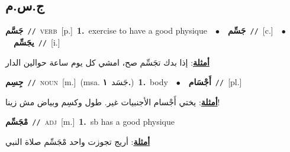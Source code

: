 \documentclass[10pt,a4paper,twoside]{article} %
\begin{document}
\begin{multicols}{2}
\vspace{-3mm}
\subsection*{\color{blue}\foreignlanguage{arabic}{ج.س.م}\color{blue}{}} 

{\setlength\topsep{0pt}\textbf{\foreignlanguage{arabic}{جَسَّم}}\ {\color{gray}\texttt{//}\color{black}}\ \textsc{verb}\ [p.]\ \textbf{1.}~exercise to have a good physique\ \ $\bullet$\ \ \setlength\topsep{0pt}\textbf{\foreignlanguage{arabic}{جَسِّم}}\ {\color{gray}\texttt{//}\color{black}}\ [c.]\ \ $\bullet$\ \ \setlength\topsep{0pt}\textbf{\foreignlanguage{arabic}{يجَسِّم}}\ {\color{gray}\texttt{//}\color{black}}\ [i.]\  \begin{flushright}\color{gray}\foreignlanguage{arabic}{\textbf{\underline{\foreignlanguage{arabic}{أمثلة}}}: إذا بدك تجَسِّم صح، امشي كل يوم ساعة حوالين الدار}\end{flushright}\color{black}} \vspace{2mm}

{\setlength\topsep{0pt}\textbf{\foreignlanguage{arabic}{جِسِم}}\ {\color{gray}\texttt{//}\color{black}}\ \textsc{noun}\ [m.]\ \color{gray}(msa. \foreignlanguage{arabic}{جَسَد}~\foreignlanguage{arabic}{\textbf{١.}})\color{black}\ \textbf{1.}~body\ \ $\bullet$\ \ \setlength\topsep{0pt}\textbf{\foreignlanguage{arabic}{أَجْسَام}}\ {\color{gray}\texttt{//}\color{black}}\ [pl.]\  \begin{flushright}\color{gray}\foreignlanguage{arabic}{\textbf{\underline{\foreignlanguage{arabic}{أمثلة}}}: يختي أَجْسام الأجنبيات غير. طول وكسِم وبياض مش زينا!}\end{flushright}\color{black}} \vspace{2mm}

{\setlength\topsep{0pt}\textbf{\foreignlanguage{arabic}{مْجَسِّم}}\ {\color{gray}\texttt{//}\color{black}}\ \textsc{adj}\ [m.]\ \textbf{1.}~sb has a good physique\  \begin{flushright}\color{gray}\foreignlanguage{arabic}{\textbf{\underline{\foreignlanguage{arabic}{أمثلة}}}: أريج تجوزت واحد مْجَسِّم صلاة النبي}\end{flushright}\color{black}} \vspace{2mm}


\end{multicols}
\end{document}
